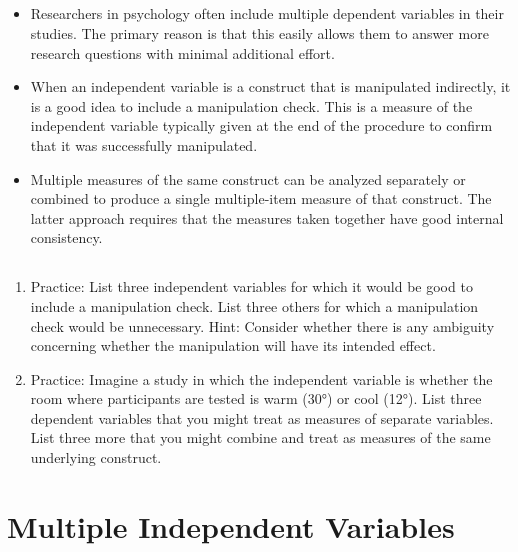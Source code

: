 \subsection{}
\begin{fullwidth}
\begin{itemize}

\item Researchers in psychology often include multiple dependent variables in their studies. The primary reason is that this easily allows them to answer more research questions with minimal additional effort.
\item  When an independent variable is a construct that is manipulated indirectly, it is a good idea to include a manipulation check. This is a measure of the independent variable typically given at the end of the procedure to confirm that it was successfully manipulated.
\item  Multiple measures of the same construct can be analyzed separately or combined to produce a single multiple-item measure of that construct. The latter approach requires that the measures taken together have good internal consistency.


\end{itemize}
\end{fullwidth}


\subsection{}
\begin{fullwidth}
\begin{enumerate}
\item  Practice: List three independent variables for which it would be good to include a manipulation check. List three others for which a manipulation check would be unnecessary. Hint: Consider whether there is any ambiguity concerning whether the manipulation will have its intended effect. 
\item Practice: Imagine a study in which the independent variable is whether the room where participants are tested is warm (30°) or cool (12°). List three dependent variables that you might treat as measures of separate variables. List three more that you might combine and treat as measures of the same underlying construct.
\end{enumerate}
\end{fullwidth}  

\newpage
\section{Multiple Independent Variables}

